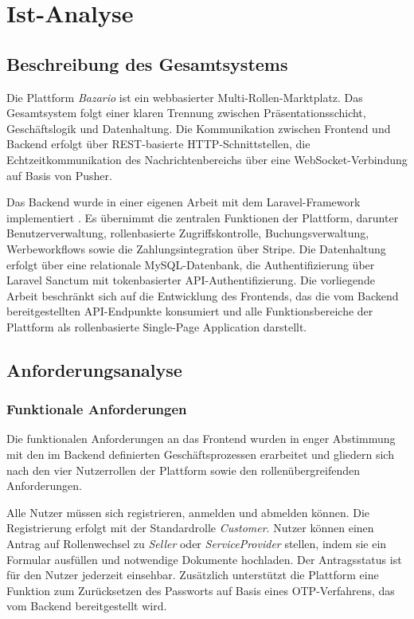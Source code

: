 \chapter{Ist-Analyse}
\label{chap:ist_analyse}

\section{Beschreibung des Gesamtsystems}
\label{sec:gesamtsystem}

Die Plattform \textit{Bazario} ist ein webbasierter
Multi-Rollen-Marktplatz. Das Gesamtsystem folgt einer
klaren Trennung zwischen Präsentationsschicht, Geschäftslogik
und Datenhaltung. Die Kommunikation zwischen Frontend und
Backend erfolgt über \acs{REST}-basierte \acs{HTTP}-Schnittstellen,
die Echtzeitkommunikation des Nachrichtenbereichs über eine
WebSocket-Verbindung auf Basis von Pusher.

Das Backend wurde in einer eigenen Arbeit mit dem Laravel-Framework
implementiert \cite{alaatki_backend}. Es übernimmt die zentralen Funktionen der
Plattform, darunter Benutzerverwaltung, rollenbasierte
Zugriffskontrolle, Buchungsverwaltung, Werbeworkflows
sowie die Zahlungsintegration über Stripe. Die Datenhaltung
erfolgt über eine relationale MySQL-Datenbank, die
Authentifizierung über Laravel Sanctum mit tokenbasierter
\acs{API}-Authentifizierung. Die vorliegende Arbeit beschränkt
sich auf die Entwicklung des Frontends, das die vom Backend
bereitgestellten \acs{API}-Endpunkte konsumiert und alle
Funktionsbereiche der Plattform als rollenbasierte
Single-Page Application darstellt.


\section{Anforderungsanalyse}
\label{sec:anforderungsanalyse}

\subsection{Funktionale Anforderungen}
\label{subsec:funktionale-anforderungen}

Die funktionalen Anforderungen an das Frontend wurden in
enger Abstimmung mit den im Backend definierten
Geschäftsprozessen erarbeitet und gliedern sich nach den
vier Nutzerrollen der Plattform sowie den rollenübergreifenden Anforderungen.

Alle Nutzer müssen sich registrieren, anmelden und abmelden
können. Die Registrierung erfolgt mit der Standardrolle
\textit{Customer}. Nutzer können einen Antrag auf Rollenwechsel zu
\textit{Seller} oder \textit{ServiceProvider} stellen, indem sie ein Formular
ausfüllen und notwendige Dokumente hochladen. Der
Antragsstatus ist für den Nutzer jederzeit einsehbar.
Zusätzlich unterstützt die Plattform eine Funktion zum Zurücksetzen des Passworts auf Basis eines
\acs{OTP}-Verfahrens, das vom Backend bereitgestellt wird.


